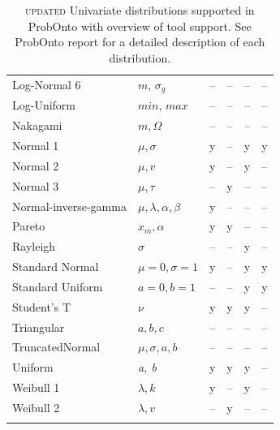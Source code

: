 {\begin{center}
\begin{longtable}{l | lcccc}
Log-Normal 6			& $m$, $\sigma_g$	& 	--	&	--	&	--	&  -- \\
Log-Uniform			& $min$, $max$	& 	--	&	--	&	--	&  -- \\
Nakagami				& $m, \Omega$	&	--	&	--	&	--	&  --  \\
Normal 1				& $\mu, \sigma$	&	y	&	--	&	y	& y  \\
Normal 2				& $\mu, v$		&	y	&	--	&	y	&  -- \\
Normal 3				& $\mu, \tau$		&	--	&	y	&	--	&  -- \\
Normal-inverse-gamma	& $\mu, \lambda, \alpha, \beta$	& y	& --  & --  &  -- \\
Pareto				& $x_m, \alpha$	& y	& y	& --  &  -- \\
Rayleigh				& $\sigma$		& --  & --  & y	&  -- \\
Standard Normal 		& $\mu\!=\!0, \sigma\!=\!1$	& y & -- &	 y & y  \\
Standard Uniform		& $a\!=\!0, b\!=\!1$		& --	& --	& y & y  \\
Student's T			& $\nu$			& y	& y	& y	&  -- \\
Triangular				& $a, b, c$		& -- 	& --	& -- & -- \\
TruncatedNormal		& $\mu, \sigma, a, b$ & --	& --  & -- & -- \\
Uniform				&  \emph{a, b}		& y	& y	& y		& --  \\
Weibull 1				& $\lambda, k$		& y	& --	& y	&  -- \\
Weibull 2				& $\lambda, v$		& --	& y	& --	&  -- \\
   \hline 
\caption{{\color{red} \scshape{updated}} Univariate distributions supported in ProbOnto with overview of tool support. 
See ProbOnto report \cite{ProbOnto:2015a} for a detailed description of each distribution.}
\label{figTable:univariates}
\vspace{-2.5em}
\end{longtable}
\end{center}

}
